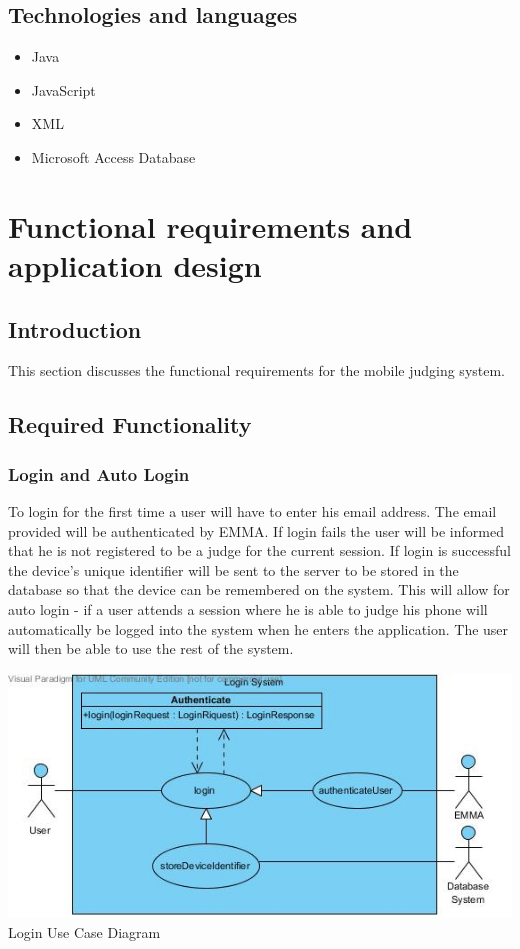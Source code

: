 \documentclass[10pt,a4paper]{article}
\begin{document}
\subsection{Technologies and languages}
\begin{itemize}
\item Java
\item JavaScript
\item XML
\item Microsoft Access Database
\end{itemize}
\section{Functional requirements and application design}
\subsection{Introduction}
This section discusses the functional requirements for the mobile judging system.
\subsection{Required Functionality}
\subsubsection{Login and Auto Login}
To login for the first time a user will have to enter his email address. The email provided will be authenticated by EMMA. If login fails the user will be informed that he is not registered to be a judge for the current session. If login is successful the device's unique identifier will be sent to the server to be stored in the database so that the device can be remembered on the system. This will allow for auto login - if a user attends a session where he is able to judge his phone will automatically be logged into the system when he enters the application. The user will then be able to use the rest of the system.

\begin{center}
\advance\leftskip-1.3cm
\includegraphics[width=160mm]{Pictures/Login.jpg} 
Login Use Case Diagram 
\end{center}
\end{document}
